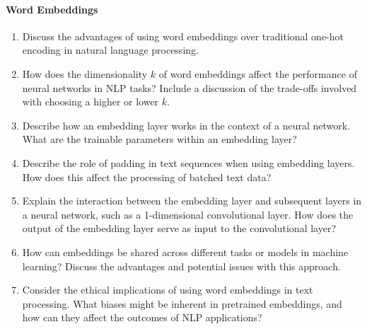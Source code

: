 \begin{advanced}
\paragraph*{Word Embeddings}
\begin{enumerate}
    \item Discuss the advantages of using word embeddings over traditional one-hot encoding in natural language processing.
    \item How does the dimensionality $k$ of word embeddings affect the performance of neural networks in NLP tasks? Include a discussion of the trade-offs involved with choosing a higher or lower $k$.
    \item Describe how an embedding layer works in the context of a neural network. What are the trainable parameters within an embedding layer?
    \item Describe the role of padding in text sequences when using embedding layers. How does this affect the processing of batched text data?
    \item Explain the interaction between the embedding layer and subsequent layers in a neural network, such as a 1-dimensional convolutional layer. How does the output of the embedding layer serve as input to the convolutional layer?
    \item How can embeddings be shared across different tasks or models in machine learning? Discuss the advantages and potential issues with this approach.
    \item Consider the ethical implications of using word embeddings in text processing. What biases might be inherent in pretrained embeddings, and how can they affect the outcomes of NLP applications?
\end{enumerate}
\end{advanced}
